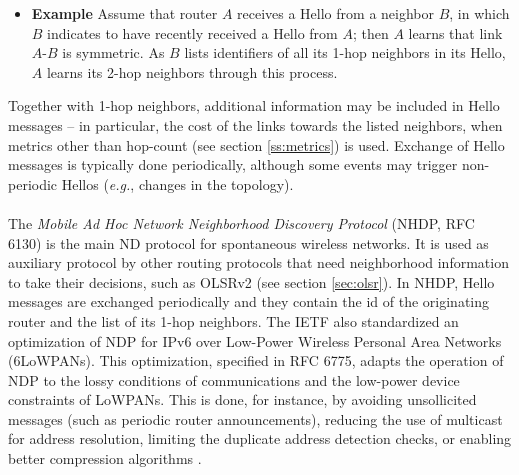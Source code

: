 \begin{itemize}
\item {\bf Example} Assume that router $A$ receives a Hello from a neighbor $B$, in which $B$ indicates to have recently received a Hello from $A$; then $A$ learns that link $A$-$B$ is symmetric. As $B$ lists identifiers of all its 1-hop neighbors in its Hello, $A$ learns its 2-hop neighbors through this process.
\end{itemize}

Together with 1-hop neighbors, additional information may be included in Hello messages -- in particular, the cost of the links towards the listed neighbors, when metrics other than hop-count (see section \ref{ss:metrics}) is used. Exchange of Hello messages is typically done periodically, although some events may trigger non-periodic Hellos ({\em e.g.}, changes in the topology). \ \\ \ \\ %
%
The {\em Mobile Ad Hoc Network Neighborhood Discovery Protocol} (NHDP, RFC 6130) \cite{rfc6130} is the main ND protocol for spontaneous wireless networks. It is used as auxiliary protocol by other routing protocols that need neighborhood information to take their decisions, such as OLSRv2 (see section \ref{sec:olsr}). In NHDP, Hello messages are exchanged periodically and they contain the id of the originating router and the list of its 1-hop neighbors. The IETF also standardized an optimization of NDP for IPv6 over Low-Power Wireless Personal Area Networks (6LoWPANs). This optimization, specified in RFC 6775, adapts the operation of NDP to the lossy conditions of communications and the low-power device constraints of LoWPANs. This is done, for instance, by avoiding unsollicited messages (such as periodic router announcements), reducing the use of multicast for address resolution, limiting the duplicate address detection checks, or enabling better compression algorithms \cite{rfc6775}. \ \\ \ \\
%
%
